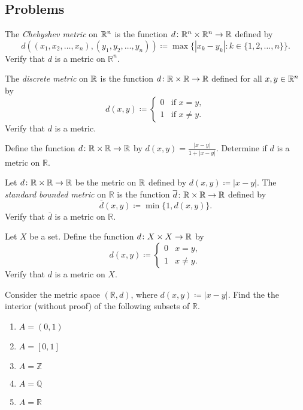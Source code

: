 \documentclass[../main.tex]{subfiles}
\begin{document}
\subsection{Problems}
\begin{homework}
    The \textit{Chebyshev metric} on $\mathbb R^n$ is the function $d\colon\mathbb R^n \times \mathbb R^n \rightarrow \mathbb R$ defined by
    \[d((x_1,x_2,\ldots,x_n),(y_1,y_2,\ldots,y_n)) \coloneqq \max\{|x_k-y_k|:k\in\{1,2,\ldots,n\}\}.\]
    Verify that $d$ is a metric on $\mathbb{R}^n$.
\end{homework}
\begin{homework}
    The \textit{discrete metric} on $\mathbb R$ is the function $d\colon\mathbb R\times\mathbb R \rightarrow \mathbb R$ defined for all $x,y \in \mathbb R^n $ by
    \[d(x,y) \coloneqq \begin{cases}
        0 & \text{if } x=y, \\
        1 & \text{if } x\ne y.
    \end{cases}\]
    Verify that $d$ is a metric.
\end{homework}
\begin{homework}
    Define the function $d\colon\mathbb R\times\mathbb R\to\mathbb R$ by $d(x,y) = \frac{|x-y|}{1 + |x-y|}$. Determine if $d$ is a metric on $\mathbb{R}$.
\end{homework}
\begin{homework}
    Let $d\colon\mathbb R\times\mathbb R\to\mathbb R$ be the metric on $\mathbb R$ defined by $d(x,y)\coloneqq|x-y|$. The \textit{standard bounded metric} on $\mathbb{R}$ is the function $\overline{d}\colon\mathbb R \times \mathbb R \rightarrow \mathbb R$ defined by
    \[\overline d(x,y)\coloneqq\min\{1,d(x,y)\}.\]
    Verify that $\overline d$ is a metric on $\mathbb{R}$.
\end{homework}
\begin{homework}
    Let $X$ be a set. Define the function $d\colon X\times X\to\mathbb R$ by
    \[d(x,y)\coloneqq\begin{cases}
        0 & x=y, \\
        1 & x\ne y.
    \end{cases}\]
    Verify that $d$ is a metric on $X$.
\end{homework}
\begin{homework} \label{prop:many-ints}
    Consider the metric space $(\mathbb{R}, d)$, where $d(x,y)\coloneqq|x - y|$. Find the the interior (without proof) of the following subsets of $\mathbb{R}$. 
    \begin{enumerate}[label=(\alph*)]
        \item $A = (0, 1)$
        \item $A = [0,1]$
        \item $A = \mathbb{Z}$
        \item $A = \mathbb{Q}$
        \item $A = \mathbb{R}$
    \end{enumerate}
\end{homework}
\end{document}
